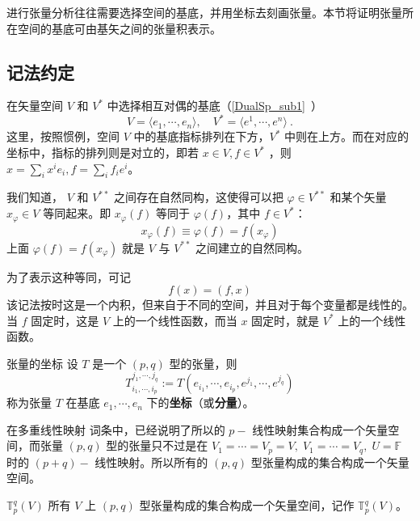 
\begin{issues}
\issueDraft
\end{issues}

进行张量分析往往需要选择空间的基底，并用坐标去刻画张量。本节将证明张量所在空间的基底可由基矢之间的张量积表示。
\subsection{记法约定}
在矢量空间 $V$ 和 $V^*$ 中选择相互对偶的基底（\autoref{DualSp_sub1}~）
\begin{equation}
V=\langle e_1,\cdots ,e_n\rangle,\quad V^*=\langle e^1,\cdots,e^n\rangle~.
\end{equation}
这里，按照惯例，空间 $V$ 中的基底指标排列在下方，$V^*$ 中则在上方。而在对应的坐标中，指标的排列则是对立的，即若 $x\in V,f\in V^*$ ，则 $x=\sum_{i}x^i e_i,f=\sum_{i}f_ie^i$。

我们知道， $V$ 和 $V^{**}$ 之间存在自然同构，这使得可以把 $\varphi\in V^{**}$ 和某个矢量 $x_{\varphi}\in V$ 等同起来。即 $x_{\varphi}(f)$ 等同于 $\varphi(f)$，其中 $f\in V^*$：
\begin{equation}
x_{\varphi}(f)\equiv\varphi(f)=f(x_{\varphi})
\end{equation}
上面 $\varphi(f)=f(x_{\varphi})$ 就是 $V$ 与 $V^{**}$ 之间建立的自然同构。

为了表示这种等同，可记
\begin{equation}\label{CofTen_eq4}
f(x)=(f,x)
\end{equation}
该记法按时这是一个内积，但来自于不同的空间，并且对于每个变量都是线性的。当 $f$ 固定时，这是 $V$ 上的一个线性函数，而当 $x$ 固定时，就是 $V^{*}$ 上的一个线性函数。
\begin{definition}{张量的坐标}\label{CofTen_def2}
设 $T$ 是一个 $(p,q)$ 型的张量，则
\begin{equation}
T^{j_1,\cdots,j_q}_{i_1,\cdots,i_p}:=T(e_{i_1},\cdots,e_{i_p},e^{j_1},\cdots,e^{j_q})
\end{equation}
称为张量 $T$ 在基底 ${e_1,\cdots,e_n}$ 下的\textbf{坐标}（或\textbf{分量}）。
\end{definition}

在多重线性映射 词条中，已经说明了所以的 $p-$ 线性映射集合构成一个矢量空间，而张量 $(p,q)$ 型的张量只不过是在 $V_1=\cdots=V_p=V,\;V_1=\cdots=V_q,\;U=\mathbb F$ 时的 $(p+q)-$ 线性映射。所以所有的 $(p,q)$ 型张量构成的集合构成一个矢量空间。
\begin{definition}{$\mathbb T^q_p(V)$}\label{CofTen_def1}
所有 $V$ 上 $(p,q)$ 型张量构成的集合构成一个矢量空间，记作 $\mathbb T^q_p(V)$。
\end{definition} 
